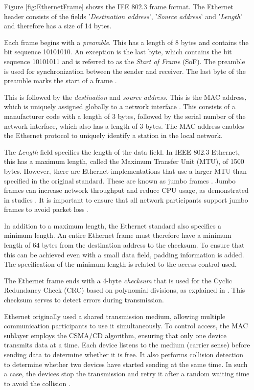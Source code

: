 Figure \ref{fig:EthernetFrame} shows the IEE 802.3 frame format. The Ethernet header consists of the fields '\textit{Destination address}', '\textit{Source address}' and '\textit{Length}' and therefore has a size of 14 bytes.

Each frame begins with a \textit{preamble}. This has a length of 8 bytes and contains the bit sequence 10101010. An exception is the last byte, which contains the bit sequence 10101011 and is referred to as the \textit{Start of Frame} (SoF). The preamble is used for synchronization between the sender and receiver. The last byte of the preamble marks the start of a frame \cite{Tanenbaum2010}.

This is followed by the \textit{destination} and \textit{source address}. This is the MAC address, which is uniquely assigned globally to a network interface \cite{Weigel2021}. This consists of a manufacturer code with a length of 3 bytes, followed by the serial number of the network interface, which also has a length of 3 bytes. The MAC address enables the Ethernet protocol to uniquely identify a station in the local network.

The \textit{Length} field specifies the length of the data field. In IEEE 802.3 Ethernet, this has a maximum length, called the Maximum Transfer Unit (MTU), of 1500 bytes. However, there are Ethernet implementations that use a larger MTU than specified in the original standard. These are known as jumbo frames \cite{EthernetJumboFrames2009}. Jumbo frames can increase network throughput and reduce CPU usage, as demonstrated in studies \cite{swsetup03}. It is important to ensure that all network participants support jumbo frames to avoid packet loss \cite{swsetup04}.

In addition to a maximum length, the Ethernet standard also specifies a minimum length. An entire Ethernet frame must therefore have a minimum length of 64 bytes from the destination address to the checksum. To ensure that this can be achieved even with a small data field, padding information is added. The specification of the minimum length is related to the access control used.

The Ethernet frame ends with a 4-byte \textit{checksum} that is used for the Cyclic Redundancy Check (CRC) based on polynomial divisions, as explained in \cite{Tanenbaum2010}.  This checksum serves to detect errors during transmission.

Ethernet originally used a shared transmission medium, allowing multiple communication participants to use it simultaneously. To control access, the MAC sublayer employs the CSMA/CD algorithm, ensuring that only one device transmits data at a time. Each device listens to the medium (carrier sense) before sending data to determine whether it is free. It also performs collision detection to determine whether two devices have started sending at the same time. In such a case, the devices stop the transmission and retry it after a random waiting time to avoid the collision \cite{Tanenbaum2010}.

